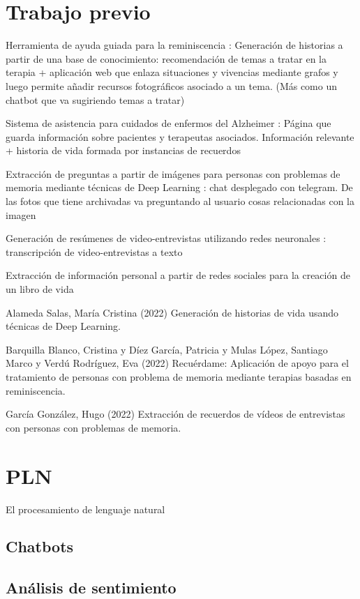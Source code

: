 \section{Trabajo previo}
Herramienta de ayuda guiada para la reminiscencia \citep{reminiscencia} : Generación de historias a partir de una base de conocimiento: recomendación de temas a tratar en la terapia + aplicación web que enlaza situaciones y vivencias mediante grafos y luego permite añadir recursos fotográficos asociado a un tema. (Más como un chatbot que va sugiriendo temas a tratar)

Sistema de asistencia para cuidados de enfermos del Alzheimer \citep{asistencia} : Página que guarda información sobre pacientes y terapeutas asociados. Información relevante + historia de vida formada por instancias de recuerdos

Extracción de preguntas a partir de imágenes para personas con problemas de memoria mediante técnicas de Deep Learning \citep{preguntas} : chat desplegado con telegram. De las fotos que tiene archivadas va preguntando al usuario cosas relacionadas con la imagen

Generación de resúmenes de video-entrevistas utilizando redes neuronales \citep{resumen} : transcripción de video-entrevistas a texto

Extracción de información personal a partir de redes sociales para la creación de un libro de vida \citep{rrss}

Alameda Salas, María Cristina (2022) Generación de historias de vida usando técnicas de Deep Learning.

Barquilla Blanco, Cristina y Díez García, Patricia y Mulas López, Santiago Marco y Verdú Rodríguez, Eva (2022) Recuérdame: Aplicación de apoyo para el tratamiento de personas con problema de memoria mediante terapias basadas en reminiscencia. 

García González, Hugo (2022) Extracción de recuerdos de vídeos de entrevistas con personas con problemas de memoria. 

\section{PLN}
El procesamiento de lenguaje natural

\subsection{Chatbots}

\subsection{Análisis de sentimiento}

